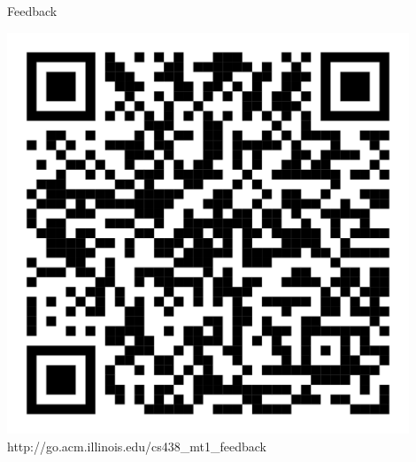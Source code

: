\documentclass{beamer}
\begin{document}
\begin{frame}{Feedback}
    \begin{center}
        \includegraphics[height=12cm]{feedback.png}
        http://go.acm.illinois.edu/cs438\_mt1\_feedback
    \end{center}
\end{frame}
\end{document}
